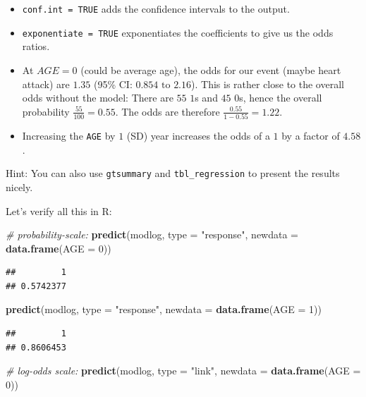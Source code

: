\documentclass[
]{book}
\newenvironment{Shaded}{\begin{snugshade}}{\end{snugshade}}
\newcommand{\AttributeTok}[1]{\textcolor[rgb]{0.13,0.29,0.53}{#1}}
\newcommand{\CommentTok}[1]{\textcolor[rgb]{0.56,0.35,0.01}{\textit{#1}}}
\newcommand{\DecValTok}[1]{\textcolor[rgb]{0.00,0.00,0.81}{#1}}
\newcommand{\FunctionTok}[1]{\textcolor[rgb]{0.13,0.29,0.53}{\textbf{#1}}}
\newcommand{\NormalTok}[1]{#1}
\newcommand{\StringTok}[1]{\textcolor[rgb]{0.31,0.60,0.02}{#1}}
\providecommand{\tightlist}{%
  \setlength{\itemsep}{0pt}\setlength{\parskip}{0pt}}
\begin{document}
\begin{itemize}
\tightlist
\item
  \texttt{conf.int\ =\ TRUE} adds the confidence intervals to the output.
\item
  \texttt{exponentiate\ =\ TRUE} exponentiates the coefficients to give us the odds ratios.
\item
  At \(AGE=0\) (could be average age), the odds for our event (maybe heart attack) are
  \(1.35\) (95\% CI: \(0.854\text{ to }2.16\)).
  This is rather close to the overall odds without the model:
  There are \(55\) \(1\)s and \(45\) \(0\)s, hence the overall probability \(\frac{55}{100} = 0.55\).
  The odds are therefore \(\frac{0.55}{1-0.55} = 1.22\).
\item
  Increasing the \texttt{AGE} by \(1\) (SD) year increases the odds of a \(1\) by a factor of
  \(4.58\).
\end{itemize}

Hint: You can also use \texttt{gtsummary} and \texttt{tbl\_regression} to present the results nicely.

Let's verify all this in R:

\begin{Shaded}
\begin{Highlighting}[]
\CommentTok{\# probability{-}scale:}
\FunctionTok{predict}\NormalTok{(modlog, }\AttributeTok{type =} \StringTok{"response"}\NormalTok{,}
        \AttributeTok{newdata =} \FunctionTok{data.frame}\NormalTok{(}\AttributeTok{AGE =} \DecValTok{0}\NormalTok{))}
\end{Highlighting}
\end{Shaded}

\begin{verbatim}
##         1 
## 0.5742377
\end{verbatim}

\begin{Shaded}
\begin{Highlighting}[]
\FunctionTok{predict}\NormalTok{(modlog, }\AttributeTok{type =} \StringTok{"response"}\NormalTok{,}
        \AttributeTok{newdata =} \FunctionTok{data.frame}\NormalTok{(}\AttributeTok{AGE =} \DecValTok{1}\NormalTok{))}
\end{Highlighting}
\end{Shaded}

\begin{verbatim}
##         1 
## 0.8606453
\end{verbatim}

\begin{Shaded}
\begin{Highlighting}[]
\CommentTok{\# log{-}odds scale:}
\FunctionTok{predict}\NormalTok{(modlog, }\AttributeTok{type =} \StringTok{"link"}\NormalTok{,}
        \AttributeTok{newdata =} \FunctionTok{data.frame}\NormalTok{(}\AttributeTok{AGE =} \DecValTok{0}\NormalTok{))}
\end{Highlighting}
\end{Shaded}
\end{document}
